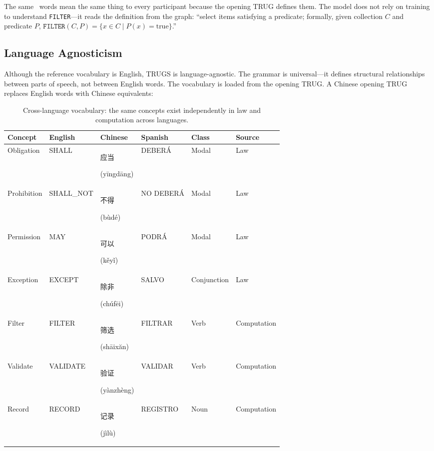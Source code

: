 \documentclass{article}
\begin{document}
The same \VocabTotal\ words mean the same thing to every participant because the opening TRUG defines them. The model does not rely on training to understand \texttt{FILTER}---it reads the definition from the graph: ``select items satisfying a predicate; formally, given collection $C$ and predicate $P$, $\texttt{FILTER}(C, P) = \{x \in C \mid P(x) = \text{true}\}$.''

\subsection{Language Agnosticism}

Although the reference vocabulary is English, TRUGS is language-agnostic. The grammar is universal---it defines structural relationships between parts of speech, not between English words. The vocabulary is loaded from the opening TRUG. A Chinese opening TRUG replaces English words with Chinese equivalents:

\begin{table}[h]
\centering
\caption{Cross-language vocabulary: the same concepts exist independently in law and computation across languages.}
\label{tab:crosslang}
\small
\begin{tabular}{llllll}
\toprule
\textbf{Concept} & \textbf{English} & \textbf{Chinese} & \textbf{Spanish} & \textbf{Class} & \textbf{Source} \\
\midrule
Obligation & SHALL & \begin{CJK}{UTF8}{gbsn}应当\end{CJK} (y\=ingd\=ang) & DEBER\'A & Modal & Law \\
Prohibition & SHALL\_NOT & \begin{CJK}{UTF8}{gbsn}不得\end{CJK} (b\`ud\'e) & NO DEBER\'A & Modal & Law \\
Permission & MAY & \begin{CJK}{UTF8}{gbsn}可以\end{CJK} (k\v{e}y\v{i}) & PODR\'A & Modal & Law \\
Exception & EXCEPT & \begin{CJK}{UTF8}{gbsn}除非\end{CJK} (ch\'uf\=ei) & SALVO & Conjunction & Law \\
Filter & FILTER & \begin{CJK}{UTF8}{gbsn}筛选\end{CJK} (sh\=aix\u{a}n) & FILTRAR & Verb & Computation \\
Validate & VALIDATE & \begin{CJK}{UTF8}{gbsn}验证\end{CJK} (y\`anzh\`eng) & VALIDAR & Verb & Computation \\
Record & RECORD & \begin{CJK}{UTF8}{gbsn}记录\end{CJK} (j\`il\`u) & REGISTRO & Noun & Computation \\
\bottomrule
\end{tabular}
\end{table}
\end{document}
